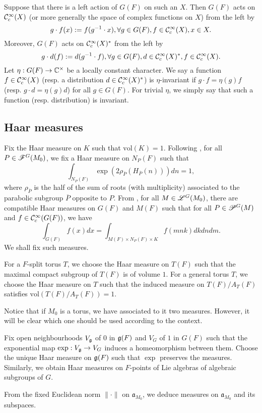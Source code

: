 \documentclass[a4paper]{amsart}
\newcommand{\fa}{{\mathfrak{a}}} \newcommand{\fb}{{\mathfrak{b}}}\newcommand{\fc}{{\mathfrak{c}}} \newcommand{\fd}{{\mathfrak{d}}}
\newcommand{\ov}{\overline}
\newcommand{\vol}{{\mathrm{vol}}}                   \newcommand{\Vol}{{\mathrm{Vol}}}
\theoremstyle{definition}
\theoremstyle{remark}
\numberwithin{equation}{subsection}
\begin{document}
Suppose that there is a left action of $G(F)$ on such an $X$. Then $G(F)$ acts on ${\mathcal {C}}_c^\infty(X)$ (or more generally the space of complex functions on $X$) from the left by
$$ g\cdot f(x):=f(g^{-1}\cdot x), \forall g\in G(F), f\in{\mathcal {C}}_c^\infty(X), x\in X. $$
Moreover, $G(F)$ acts on ${\mathcal {C}}_c^\infty(X)^\ast$ from the left by
$$ g\cdot d(f):=d(g^{-1}\cdot f), \forall g\in G(F), d\in{\mathcal {C}}_c^\infty(X)^\ast, f\in{\mathcal {C}}_c^\infty(X). $$
Let $\eta: G(F)\rightarrow{\mathbb {C}}^\times$ be a locally constant character. We say a function $f\in{\mathcal {C}}_c^\infty(X)$ (resp. a distribution $d\in{\mathcal {C}}_c^\infty(X)^\ast$) is $\eta$-invariant if $g\cdot f=\eta(g)f$ (resp. $g\cdot d=\eta(g)d$) for all $g\in G(F)$. For trivial $\eta$, we simply say that such a function (resp. distribution) is invariant. 

\subsection{Haar measures}\label{haarmeasure}
Fix the Haar measure on $K$ such that $\vol(K)=1$. Following \cite[\S I.4]{MR1344131}, for all $P\in\mathscr{F}^G(M_0)$, we fix a Haar measure on $N_P(F)$ such that
$$ \int_{N_P(F)} \exp (2\rho_{\ov{P}}(H_{\ov{P}}(n))) dn =1, $$
where $\rho_{\ov{P}}$ is the half of the sum of roots (with multiplicity) associated to the parabolic subgroup $\ov{P}$ opposite to $P$. From \cite[p. 12]{MR1114210}, for all $M\in\mathscr{L}^G(M_0)$, there are compatible Haar measures on $G(F)$ and $M(F)$ such that for all $P\in\mathscr{P}^G(M)$ and $f\in{\mathcal {C}}_c^\infty(G(F))$, we have
$$ \int_{G(F)} f(x) dx = \int_{M(F)\times N_P(F)\times K} f(mnk) dkdndm. $$
We shall fix such measures. 

For a $F$-split torus $T$, we choose the Haar measure on $T(F)$ such that the maximal compact subgroup of $T(F)$ is of volume $1$. For a general torus $T$, we choose the Haar measure on $T$ such that the induced measure on $T(F)/A_T(F)$ satisfies $\vol(T(F)/A_T(F))=1$. 

Notice that if $M_0$ is a torus, we have associated to it two measures. However, it will be clear which one should be used according to the context.  

Fix open neighbourhoods $V_{\mathfrak{g}}$ of $0$ in ${\mathfrak{g}}(F)$ and $V_G$ of $1$ in $G(F)$ such that the exponential map $\exp: V_{\mathfrak{g}}\rightarrow V_G$ induces a homeomorphism between them. 
Choose the unique Haar measure on ${\mathfrak{g}}(F)$ such that $\exp$ preserves the measures. Similarly, we obtain Haar measures on $F$-points of Lie algebras of algebraic subgroups of $G$. 

From the fixed Euclidean norm $\|\cdot\|$ on $\fa_{M_0}$, we deduce measures on $\fa_{M_0}$ and its subspaces. 
\end{document}
